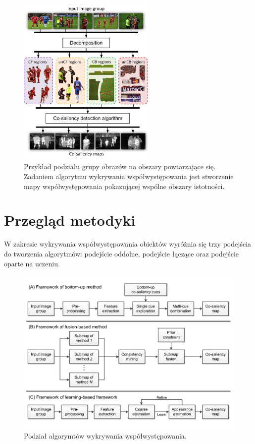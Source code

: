\documentclass[a4paper,11pt, notitlepage, twosides, openany ]{report}
\begin{document}
	\begin{figure}[h]
		\centering
		\includegraphics[width=0.6\textwidth]{cosaliency.png}
		\caption{Przykład podziału grupy obrazów na obszary powtarzające się. Zadaniem algorytmu wykrywania współwystępowania jest stworzenie mapy współwystępowania pokazującej wspólne obszary istotności.}
		\label{co}
	\end{figure}

	\section{Przegląd metodyki}
	W zakresie wykrywania współwystępowania obiektów wyróżnia się trzy podejścia do tworzenia algorytmów: podejście oddolne, podejście łączące oraz podejście oparte na uczeniu.

	\begin{figure}[h]
		\centering
		\includegraphics[width=1\textwidth]{cosal_met.png}
		\caption{Podział algorymtów wykrywania współwystępowania.}
		\label{pod}
	\end{figure}
\end{document}

